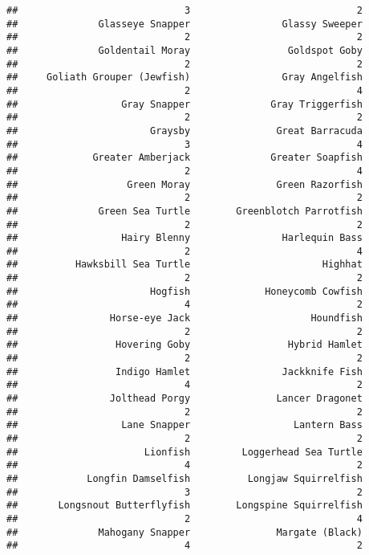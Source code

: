 \documentclass[
]{article}
\begin{document}
\begin{verbatim}
##                             3                             2 
##              Glasseye Snapper                Glassy Sweeper 
##                             2                             2 
##              Goldentail Moray                 Goldspot Goby 
##                             2                             2 
##     Goliath Grouper (Jewfish)                Gray Angelfish 
##                             2                             4 
##                  Gray Snapper              Gray Triggerfish 
##                             2                             2 
##                       Graysby               Great Barracuda 
##                             3                             4 
##             Greater Amberjack              Greater Soapfish 
##                             2                             4 
##                   Green Moray               Green Razorfish 
##                             2                             2 
##              Green Sea Turtle        Greenblotch Parrotfish 
##                             2                             2 
##                  Hairy Blenny                Harlequin Bass 
##                             2                             4 
##          Hawksbill Sea Turtle                       Highhat 
##                             2                             2 
##                       Hogfish             Honeycomb Cowfish 
##                             4                             2 
##                Horse-eye Jack                     Houndfish 
##                             2                             2 
##                 Hovering Goby                 Hybrid Hamlet 
##                             2                             2 
##                 Indigo Hamlet                Jackknife Fish 
##                             4                             2 
##                Jolthead Porgy               Lancer Dragonet 
##                             2                             2 
##                  Lane Snapper                  Lantern Bass 
##                             2                             2 
##                      Lionfish         Loggerhead Sea Turtle 
##                             4                             2 
##            Longfin Damselfish          Longjaw Squirrelfish 
##                             3                             2 
##       Longsnout Butterflyfish        Longspine Squirrelfish 
##                             2                             4 
##              Mahogany Snapper               Margate (Black) 
##                             4                             2 

\end{verbatim}
\end{document}
